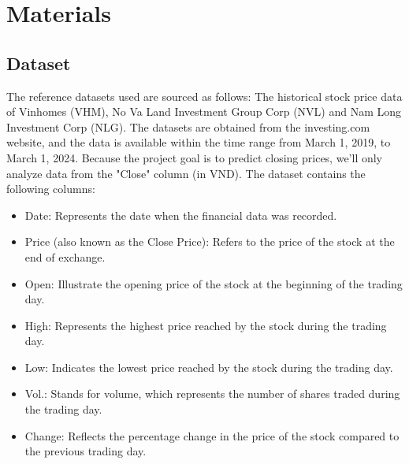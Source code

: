 \documentclass{ieeeojies}
\begin{document}
\section{Materials}
\subsection{Dataset}
The reference datasets used are sourced as follows: The historical stock price data of Vinhomes (VHM), No Va Land Investment Group Corp (NVL) and Nam Long Investment Corp (NLG). The datasets are obtained from the investing.com website, and the data is available within the time range from March 1, 2019, to March 1, 2024. Because the project goal is to predict closing prices, we'll only analyze data from the "Close" column (in VND). The dataset contains the following columns:
\begin{itemize}
\item Date: Represents the date when the financial data was recorded.
\item Price (also known as the Close Price): Refers to the price of the stock at the end of
exchange.
\item Open: Illustrate the opening price of the stock at the beginning of the trading day.
\item High: Represents the highest price reached by the stock during the trading day.
\item Low: Indicates the lowest price reached by the stock during the trading day.
\item Vol.: Stands for volume, which represents the number of shares traded during the
trading day.
\item Change: Reflects the percentage change in the price of the stock compared to the
previous trading day.
\end{itemize}
\end{document}

